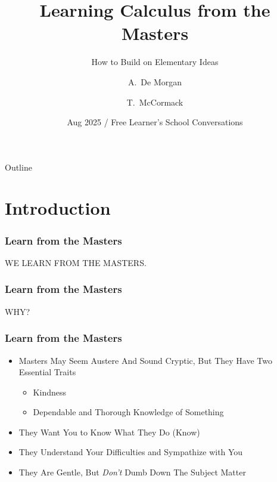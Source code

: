 \documentclass{beamer}
\title[Getting Started with Calculus] %
{Learning Calculus from the Masters}
\subtitle
{How to Build on Elementary Ideas} %
\author[Augustus De Morgan, Thomas McCormack, KM] %
{A.~De Morgan\inst{1} \and T.~McCormack\inst{2}}
\institute[SDUK] %
{
  \inst{1}%
  Original Author
  \and
  \inst{2}%
  First Maintainer
  }
\date[August 2025] %
{Aug 2025 / Free Learner's School Conversations}
\begin{document}
\begin{frame}
  \titlepage
\end{frame}

\begin{frame}{Outline}
  \tableofcontents
\end{frame}




\section{Introduction}


\begin{frame}
\frametitle{Learn from the Masters}
{\Large WE LEARN FROM THE MASTERS.}
\end{frame}

\begin{frame}
\frametitle{Learn from the Masters}
WHY?
\end{frame}
\begin{frame}
\frametitle{Learn from the Masters}
\begin{itemize}
\pause
\item Masters May Seem Austere And Sound Cryptic, \pause But They Have Two Essential Traits
\pause
\begin{itemize}
\item Kindness 
\item Dependable and Thorough Knowledge of Something
\end{itemize}
\pause
\item They Want You to Know What They Do (Know)
\pause
\item They Understand Your Difficulties and Sympathize with You
\pause
\item They Are Gentle, But \emph{Don't} Dumb Down The Subject Matter
\end{itemize}
\end{frame}
\end{document}
